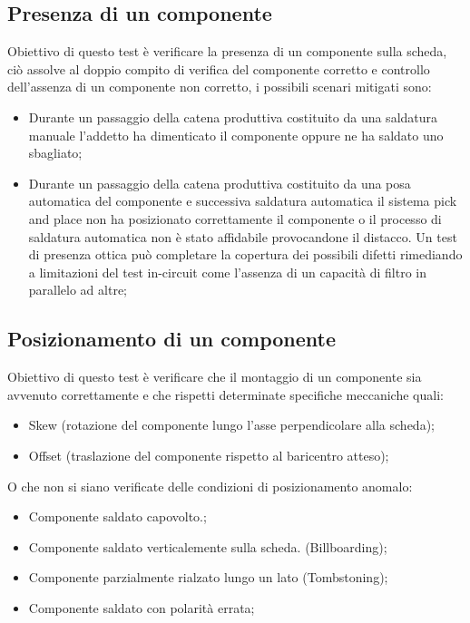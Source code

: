 \subsection{Presenza di un componente}
Obiettivo di questo test è verificare la presenza di un componente sulla scheda, ciò assolve al doppio
compito di verifica del componente corretto e controllo dell’assenza di un componente non corretto, i
possibili scenari mitigati sono:
\begin{itemize}
\item Durante un passaggio della catena produttiva costituito da una saldatura manuale l’addetto ha
dimenticato il componente oppure ne ha saldato uno sbagliato;
\item Durante un passaggio della catena produttiva costituito da una posa automatica del componente
e successiva saldatura automatica il sistema pick and place non ha posizionato correttamente il
componente o il processo di saldatura automatica non è stato affidabile provocandone il distacco.
Un test di presenza ottica può completare la copertura dei possibili difetti rimediando a limitazioni del
test in-circuit come l’assenza di un capacità di filtro in parallelo ad altre;
\end{itemize}

\subsection{Posizionamento di un componente}
Obiettivo di questo test è verificare che il montaggio di un componente sia avvenuto correttamente e che
rispetti determinate specifiche meccaniche quali:
\begin{itemize}
\item Skew (rotazione del componente lungo l’asse perpendicolare alla scheda);
\item Offset (traslazione del componente rispetto al baricentro atteso);
\end{itemize}

O che non si siano verificate delle condizioni di posizionamento anomalo:
\begin{itemize}
\item Componente saldato capovolto.;
\item Componente saldato verticalemente sulla scheda. (Billboarding);
\item Componente parzialmente rialzato lungo un lato (Tombstoning);
\item Componente saldato con polarità errata;
\end{itemize}

